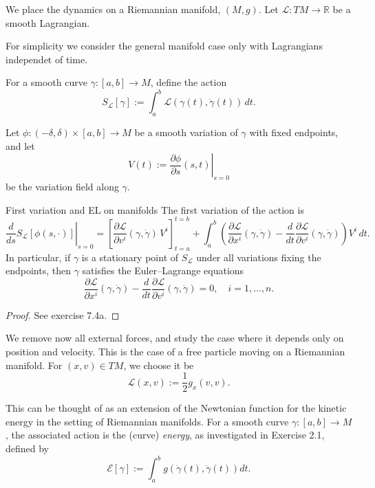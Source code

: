 We place the dynamics on a Riemannian manifold, $(M,g)$. Let $\mathcal{L}:TM \to \mathbb{R}$ be a smooth Lagrangian.


For simplicity we consider the general manifold case only with Lagrangians independet of time.

For a smooth curve $\gamma:[a,b]\to M$, define the action
\[
S_{\mathcal{L}}[\gamma] := \int_a^b \mathcal{L}(\gamma(t), \dot{\gamma}(t)) \, dt.
\]

Let $\phi:(-\delta,\delta)\times[a,b]\to M$ be a smooth variation of $\gamma$ with fixed endpoints, and let
\[
V(t) := \left.\frac{\partial \phi}{\partial s}(s,t)\right|_{s=0}
\]
be the variation field along $\gamma$. 


\begin{colorlem}{First variation and EL on manifolds}{}
The first variation of the action is
\[
\left.\frac{d}{ds} S_{\mathcal{L}}[\phi(s,\cdot)] \right|_{s=0}
=
\left[ \frac{\partial \mathcal{L}}{\partial v^i}(\gamma,\dot{\gamma}) \, V^i \right]_{t=a}^{t=b}
+
\int_a^b \left(
\frac{\partial \mathcal{L}}{\partial x^i}(\gamma,\dot{\gamma})
-
\frac{d}{dt}\frac{\partial \mathcal{L}}{\partial v^i}(\gamma,\dot{\gamma})
\right) V^i \, dt.
\]
In particular, if $\gamma$ is a stationary point of $S_{\mathcal{L}}$ under all variations fixing the endpoints, then $\gamma$ satisfies the Euler--Lagrange equations
\begin{equation}
\label{EL2}
\frac{\partial \mathcal{L}}{\partial x^i}(\gamma,\dot{\gamma})
-
\frac{d}{dt}\frac{\partial \mathcal{L}}{\partial v^i}(\gamma,\dot{\gamma})
= 0,
\quad i=1,\dots,n.\tag{EL2}
\end{equation}

\end{colorlem}
\begin{proof}
See exercise 7.4a.
\end{proof}

We remove now all external forces, and study the case where it depends only on position and velocity. This is the case of a free particle moving on a Riemannian manifold. For $(x,v)\in TM$, we choose it be 
\begin{equation}
    \label{eq:kinetic_energy_lagrangian}
    \mathcal{L}(x,v) := \frac12 g_x(v,v).
\end{equation}

This can be thought of as an extension of the Newtonian function for the kinetic energy in
the setting of Riemannian manifolds. For a smooth curve $\gamma:[a,b]\to M$, the associated action is the (curve) \emph{energy}, as investigated in Exercise 2.1, defined by
\begin{equation}
    \label{eq:energy_functional}
    \mathcal{E}[\gamma] := \int_a^b g(\dot\gamma(t),\dot\gamma(t))dt.
\end{equation}

